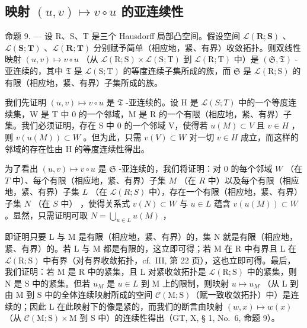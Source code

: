 \subsection{\texorpdfstring{映射 \((u, v) \mapsto v \circ u\) 的亚连续性}{映射 (u, v) \textbackslash mapsto v \textbackslash circ u 的亚连续性}}

命题 9. --- 设 R、S、T 是三个 Hausdorff 局部凸空间。假设空间 \(\mathcal{L}(\mathbf{R};\mathbf{S})\) 、\(\mathcal{L}(\mathbf{S};\mathbf{T})\) 、\(\mathcal{L}(\mathbf{R};\mathbf{T})\) 分别赋予简单（相应地，紧、有界）收敛拓扑。则双线性映射 \((u, v) \mapsto v \circ u\) （从 \(\mathcal{L}(\mathrm{R}; \mathrm{S}) \times \mathcal{L}(\mathrm{S}; \mathrm{T})\) 到 \(\mathcal{L}(\mathrm{R}; \mathrm{T})\) 中）是 \((\mathfrak{S}, \mathfrak{T})\) -亚连续的，其中 \(\mathfrak{T}\) 是 \(\mathcal{L}(\mathrm{S}; \mathrm{T})\) 的等度连续子集所成的族，而 \(\mathfrak{S}\) 是 \(\mathcal{L}(\mathrm{R}; \mathrm{S})\) 的有限（相应地，紧、有界）子集所成的族。

我们先证明 \((u, v) \mapsto v \circ u\) 是 \(\mathfrak{T}\) -亚连续的。设 H 是 \(\mathcal{L}(S; T)\) 中的一个等度连续集，W 是 T 中 0 的一个邻域，M 是 R 的一个有限（相应地，紧、有界）子集。我们必须证明，存在 S 中 0 的一个邻域 V，使得若 \(u(M) \subset V\) 且 \(v \in H\) ，则 \(v(u(M)) \subset W\) 。但为此，只需 \(v(V) \subset W\) 对一切 \(v \in H\) 成立，而这样的邻域的存在性由 H 的等度连续性得出。

为了看出 \((u, v) \mapsto v \circ u\) 是 \(\mathfrak{S}\) -亚连续的，我们将证明：对 0 的每个邻域 \(W\) （在 \(T\) 中）、每个有限（相应地，紧、有界）子集 \(M\) （在 \(R\) 中）以及每个有限（相应地，紧、有界）子集 \(L\) （在 \(\mathcal{L}(R; S)\) 中），存在一个有限（相应地，紧、有界）子集 \(N\) （在 \(S\) 中） ，使得关系式 \(v(N) \subset W\) 与 \(u \in L\) 蕴含 \(v(u(M)) \subset W\) 。显然，只需证明可取 \(N = \bigcup_{u \in L} u(M)\) ，

即证明只要 L 与 M 是有限（相应地，紧、有界）的，集 N 就是有限（相应地，紧、有界）的。若 L 与 M 都是有限的，这立即可得；若 M 在 R 中有界且 L 在 \(\mathcal{L}(\mathrm{R};\mathrm{S})\) 中有界（对有界收敛拓扑，cf.~III, 第 22 页），这也立即可得。最后，我们证明：若 M 是 R 中的紧集，且 L 对紧收敛拓扑是 \(\mathcal{L}(\mathrm{R};\mathrm{S})\) 中的紧集，则 N 是 S 中的紧集。但若 \(u_{M}\) 是 \(u \in L\) 到 M 上的限制，则映射 \(u \mapsto u_{M}\) （从 L 到由 M 到 S 中的全体连续映射所成的空间 \(\mathcal{C}(\mathrm{M};\mathrm{S})\)（赋一致收敛拓扑）中）是连续的；因此 L 在此映射下的像是紧的，而我们的断言由映射 \((w,x) \mapsto w(x)\) （从 \(\mathcal{C}(\mathrm{M};\mathrm{S}) \times \mathrm{M}\) 到 S 中）的连续性得出（GT, X, § 1, No.~6, 命题 9）。

